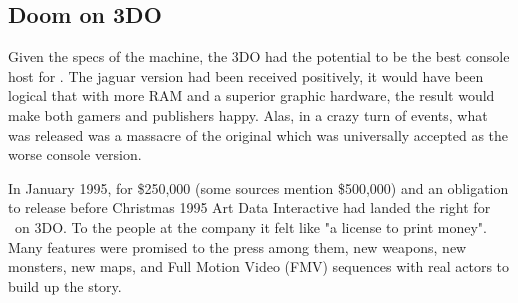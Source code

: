 \subsection{Doom on 3DO}
Given the specs of the machine, the 3DO had the potential to be the best console host for \doom. The jaguar version had been received positively, it would have been logical that with more RAM and a superior graphic hardware, the result would make both gamers and publishers happy. Alas, in a crazy turn of events, what was released was a massacre of the original which was universally accepted as the worse console version.\\  
\par
In January 1995, for \$250,000 (some sources mention \$500,000) and an obligation to release before Christmas 1995 Art Data Interactive had landed the right for \doom~on 3DO. To the people at the company it felt like "a license to print money". Many features were promised to the press among them, new weapons, new monsters, new maps, and Full Motion Video (FMV) sequences with real actors to build up the story.\\
\par
{}
\par



